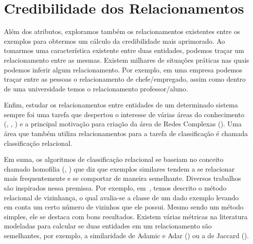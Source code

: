 

\section{Credibilidade dos Relacionamentos}
\label{sec::classificacaografos}

Além dos atributos, exploramos também os relacionamentos existentes entre os exemplos para obtermos um cálculo da credibilidade mais aprimorado.
Ao tomarmos uma característica existente entre duas entidades, podemos traçar um relacionamento entre as mesmas.
Existem milhares de situações práticas nas quais podemos inferir algum relacionamento. Por exemplo, em uma empresa podemos traçar entre as pessoas o relacionamento de chefe/empregado, assim como dentro de uma universidade temos o relacionamento professor/aluno. 

Enfim, estudar os relacionamentos entre entidades de um determinado sistema sempre foi uma tarefa que despertou o interesse de várias áreas do conhecimento (\cite{Onody04}, \cite{Shen05}, \cite{Rubinov10}) e a principal motivação para criação da área de Redes Complexas (\cite{Newman03}).
Uma área que também utiliza relacionamentos para a tarefa de classificação é chamada classificação relacional. %

Em suma, os algoritmos de classificação relacional se baseiam no conceito chamado homofilia (\cite{Blau77}, \cite{Mcpherson01})
que diz que 
exemplos similares tendem a se relacionar mais frequentemente e se comportar de maneira semelhante.
Diversos trabalhos são inspirados nessa premissa. Por exemplo, em~\cite{Macskassy04}, temos descrito o método relacional de vizinhança, o qual avalia-se 
a classe de um dado exemplo levando em conta um certo número de vizinhos que ele possui. Mesmo sendo um método simples, ele se destaca com bons resultados.
Existem várias métricas na literatura modeladas para calcular se duas entidades em um relacionamento são semelhantes, por exemplo, a similaridade de Adamic e Adar (\cite{Adamic03}) ou a de Jaccard (\cite{Jaccard01}).

